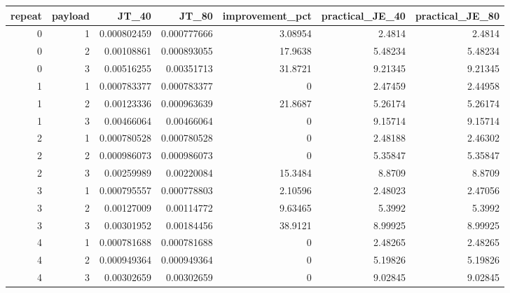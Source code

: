 \begin{tabular}{rrrrrrr}
\toprule
repeat & payload & JT\_40 & JT\_80 & improvement\_pct & practical\_JE\_40 & practical\_JE\_80 \\
\midrule
0 & 1 & 0.000802459 & 0.000777666 & 3.08954 & 2.4814 & 2.4814 \\
0 & 2 & 0.00108861 & 0.000893055 & 17.9638 & 5.48234 & 5.48234 \\
0 & 3 & 0.00516255 & 0.00351713 & 31.8721 & 9.21345 & 9.21345 \\
1 & 1 & 0.000783377 & 0.000783377 & 0 & 2.47459 & 2.44958 \\
1 & 2 & 0.00123336 & 0.000963639 & 21.8687 & 5.26174 & 5.26174 \\
1 & 3 & 0.00466064 & 0.00466064 & 0 & 9.15714 & 9.15714 \\
2 & 1 & 0.000780528 & 0.000780528 & 0 & 2.48188 & 2.46302 \\
2 & 2 & 0.000986073 & 0.000986073 & 0 & 5.35847 & 5.35847 \\
2 & 3 & 0.00259989 & 0.00220084 & 15.3484 & 8.8709 & 8.8709 \\
3 & 1 & 0.000795557 & 0.000778803 & 2.10596 & 2.48023 & 2.47056 \\
3 & 2 & 0.00127009 & 0.00114772 & 9.63465 & 5.3992 & 5.3992 \\
3 & 3 & 0.00301952 & 0.00184456 & 38.9121 & 8.99925 & 8.99925 \\
4 & 1 & 0.000781688 & 0.000781688 & 0 & 2.48265 & 2.48265 \\
4 & 2 & 0.000949364 & 0.000949364 & 0 & 5.19826 & 5.19826 \\
4 & 3 & 0.00302659 & 0.00302659 & 0 & 9.02845 & 9.02845 \\
\bottomrule
\end{tabular}
